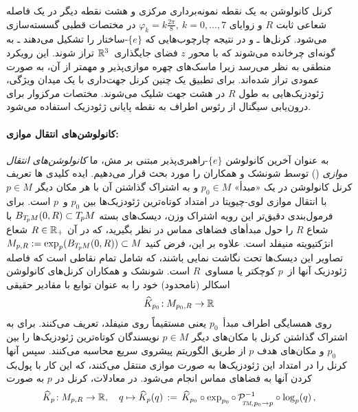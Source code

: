 کرنل کانولوشن به یک نقطه نمونه‌برداری مرکزی و هشت نقطه دیگر در یک فاصله شعاعی ثابت $R$ و زوایای $\varphi_k = k\frac{2\pi}{8},\ k=0,\dots,7$ در مختصات قطبی گسسته‌سازی می‌شود.
کرنل‌ها ـ و در نتیجه چارچوب‌هایی که $\{e\}$-ساختار را تشکیل می‌دهند ـ به گونه‌ای چرخانده می‌شوند که با محور $z$ فضای جایگذاری~$\mathbb{R}^3$ تراز شوند.
این رویکرد منطقی به نظر می‌رسد زیرا ماسک‌های چهره موازی‌پذیر و مهمتر از آن، به صورت عمودی تراز شده‌اند.
برای تطبیق یک چنین کرنل جهت‌داری با یک میدان ویژگی، ژئودزیک‌هایی به طول $R$ در هشت جهت شلیک می‌شوند.
مختصات مرکزوار برای درون‌یابی سیگنال از رئوس اطراف به نقطه پایانی ژئودزیک استفاده می‌شود.








\paragraph{کانولوشن‌های انتقال موازی:}
به عنوان آخرین کانولوشن $\{e\}$-راهبری‌پذیر مبتنی بر مش، ما \emph{کانولوشن‌های انتقال موازی} () توسط شونشک و همکاران\cite{schonsheck2018parallel} را مورد بحث قرار می‌دهیم.
ایده کلیدی ها تعریف کرنل کانولوشن در یک «مبدأ» $p_0 \in M$ و به اشتراک گذاشتن آن با هر مکان دیگر $p\in M$ با انتقال موازی لوی-چیویتا در امتداد کوتاه‌ترین ژئودزیک‌ها بین $p_0$ و~$p$ است.
برای فرمول‌بندی دقیق‌تر این رویه اشتراک وزن، دیسک‌های بسته $B_{T_{\mkern-1.5mu p}\mkern-.5muM}(0,R) \subset T_{\mkern-1.5mu p}\mkern-.5muM$ با شعاع $R$ را حول مبدأهای فضاهای مماس در نظر بگیرید، که در آن $R\in\mathbb{R}_+$ شعاع انژکتیویته منیفلد است.
علاوه بر این، فرض کنید $M_{p,R} := \exp_p( B_{T_{\mkern-1.5mu p}\mkern-.5muM}(0,R)) \subset M$ تصاویر این دیسک‌ها تحت نگاشت نمایی باشند، که شامل تمام نقاطی است که فاصله ژئودزیک آنها از~$p$ کوچکتر یا مساوی~$R$ است.
شونشک و همکاران \cite{schonsheck2018parallel} کرنل‌های کانولوشن اسکالر (نامحدود) خود را به عنوان توابع با مقادیر حقیقی
\begin{align}
    \widehat{K}_{p_0} \!: M_{p_0,R} \to \mathbb{R}
\end{align}
روی همسایگی اطراف مبدأ~$p_0$ یعنی مستقیماً روی منیفلد، تعریف می‌کنند.
برای به اشتراک گذاشتن کرنل با مکان‌های دیگر $p\in M$ نویسندگان کوتاه‌ترین ژئودزیک‌ها را بین $p_0$ و مکان‌های هدف $p$ از طریق الگوریتم پیشروی سریع محاسبه می‌کنند.
سپس آنها کرنل را در امتداد این ژئودزیک‌ها به صورت موازی منتقل می‌کنند، که این کار با پول‌بک کردن آنها به فضاهای مماس انجام می‌شود.
در معادلات، کرنل در $p$ به صورت
\begin{align}\label{eq:PTCs_kernel_transport}
    \widehat{K}_p \!: M_{p,R} \to \R ,\quad
    q \mapsto \widehat{K}_p(q) \,:=\,
    \widehat{K}_{p_0} \circ \exp_{p_0} \circ\,
    \mathcal{P}_{\mkern-2mu\overset{}{\protect\scalebox{.6}{$\!T\!M$}\mkern-2mu,\mkern1mu p_0\to p}}^{-1}
    \circ \log_p (q) \,,
\end{align}

